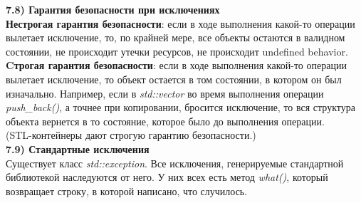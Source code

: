\documentclass{article}
\begin{document}
\noindent \textbf{7.8) Гарантия безопасности при исключениях}\\
\textbf{Нестрогая гарантия безопасности}: если в ходе выполнения какой-то операции вылетает исключение, то, по крайней мере, все объекты остаются в валидном состоянии, не происходит утечки ресурсов, не происходит undefined behavior.\\
\textbf{Cтрогая гарантия безопасности}: если в ходе выполнения какой-то операции вылетает исключение, то объект остается в том состоянии, в котором он был изначально. Например, если в \textit{std::vector} во время выполнения операции \textit{push\_back()}, а точнее при копировании, бросится исключение, то вся структура объекта вернется в то состояние, которое было до выполнения операции.\\
(STL-контейнеры дают строгую гарантию безопасности.)\\
\noindent \textbf{7.9) Стандартные исключения}\\
Существует класс \textit{std::exception}. Все исключения, генерируемые стандартной библиотекой наследуются от него. У них всех есть метод \textit{what()}, который возвращает строку, в которой написано, что случилось.
\end{document}
